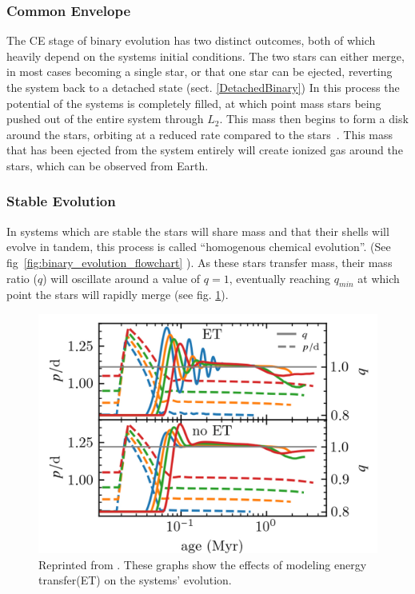 \documentclass[12pt, letterpaper]{article}
\begin{document}
        \subsubsection{Common Envelope}\label{CommonEnvelope}
            The CE stage of binary evolution has two distinct outcomes, both of which heavily depend on the systems initial conditions. The two stars can either merge, in most cases becoming a single star, or that one star can be ejected, reverting the system back to a detached state (sect. \ref{DetachedBinary}) In this process the potential of the systems is completely filled, at which point mass stars being pushed out of the entire system through $L_2$. This mass then begins to form a disk around the stars, orbiting at a reduced rate compared to the stars~\cite{TaurisvandenHeuvel+2023}. This mass that has been ejected from the system entirely will create ionized gas around the stars, which can be observed from Earth. ~\cite{TaurisvandenHeuvel+2023}

        \subsubsection{Stable Evolution}\label{CommonEnvelopeStableEvoluton}
            In systems which are stable the stars will share mass and that their shells will evolve in tandem, this process is called ``homogenous chemical evolution''. (See fig~\ref{fig:binary_evolution_flowchart} \cite{Chen_2024}). As these stars transfer mass, their mass ratio ($q$) will oscillate around a value of $q=1$, eventually reaching $q_{min}$ at which point the stars will rapidly merge (see fig. \ref{qEvolution}). \cite{Pešta_2023}
            
        \begin{figure}[H]
            \centering
            \includegraphics[scale = .3]{figs/reused-figs/q-ratio_evolution_farby.png}
            \caption{Reprinted from \cite{Fabry_2025}. These graphs show the effects of modeling energy transfer(ET) on the systems' evolution.}
            \label{qEvolution}
        \end{figure}
\end{document}
